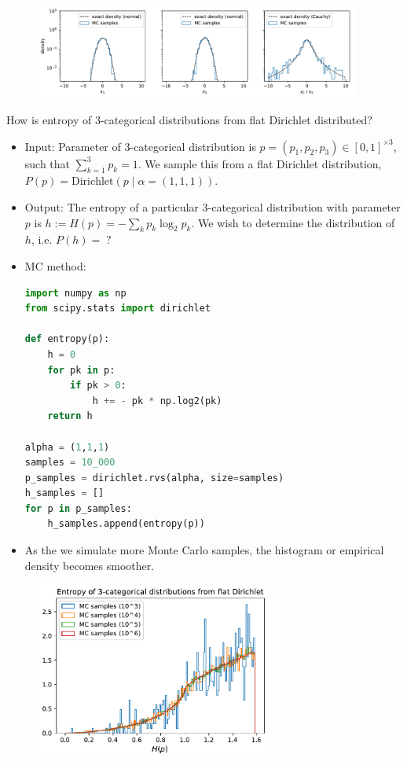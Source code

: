\begin{figure}[h]
\centering
	\includegraphics[width=0.95\textwidth]{./figs/07-Cauchy.pdf}
\end{figure}

\newpage
{} How is entropy of 3-categorical distributions from flat Dirichlet distributed?
\begin{itemize}
	\item Input: Parameter of 3-categorical distribution is $p = (p_1, p_2, p_3) \in [0,1]^{\times 3}$, such that $\sum_{k=1}^3 p_k = 1$. We sample this from a flat Dirichlet distribution, $P(p) = \text{Dirichlet}(p\;|\;\alpha = (1,1,1))$.
	\item Output: The entropy of a particular 3-categorical distribution with parameter $p$ is $h := H(p) = -\sum_k p_k \log_2 p_k$. We wish to determine the distribution of $h$, i.e. $P(h) = \;?$
	\item MC method:
\begin{lstlisting}[language=python]
import numpy as np
from scipy.stats import dirichlet

def entropy(p):
    h = 0
    for pk in p:
        if pk > 0:
            h += - pk * np.log2(pk)
    return h

alpha = (1,1,1)
samples = 10_000
p_samples = dirichlet.rvs(alpha, size=samples)
h_samples = []    
for p in p_samples:
    h_samples.append(entropy(p))
\end{lstlisting}

\item As the we simulate more Monte Carlo samples, the histogram or empirical density becomes smoother.
\end{itemize}

\begin{figure}[h]
\centering
	\includegraphics[width=0.7\textwidth]{./figs/07-entropy.pdf}
\end{figure}

